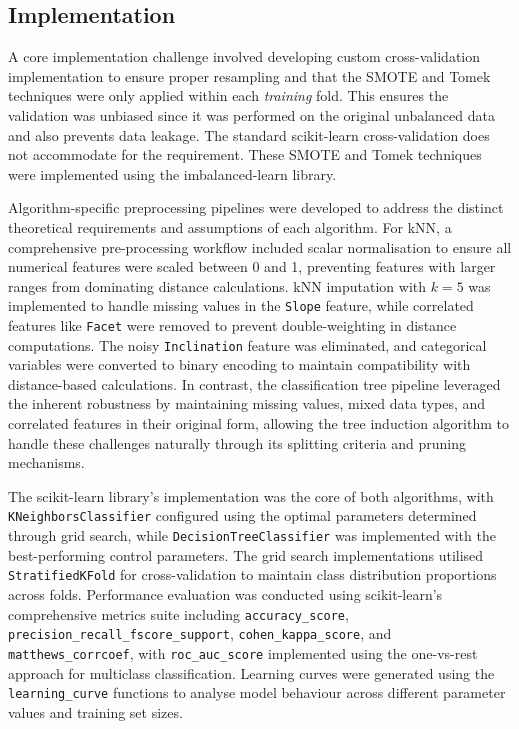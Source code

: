 \documentclass[10pt, conference]{IEEEtran}
\begin{document}
\subsection{Implementation}
A core implementation challenge involved developing custom cross-validation implementation to ensure proper resampling and that the SMOTE and Tomek techniques were only applied within each \textit{training} fold. This ensures the validation was unbiased since it was performed on the original unbalanced data and also prevents data leakage. The standard scikit-learn cross-validation does not accommodate for the requirement. These SMOTE and Tomek techniques were implemented using the imbalanced-learn library.

Algorithm-specific preprocessing pipelines were developed to address the distinct theoretical requirements and assumptions of each algorithm. For kNN, a comprehensive pre-processing workflow included scalar normalisation to ensure all numerical features were scaled between 0 and 1, preventing features with larger ranges from dominating distance calculations. kNN imputation with $k=5$ was implemented to handle missing values in the \texttt{Slope} feature, while correlated features like \texttt{Facet} were removed to prevent double-weighting in distance computations. The noisy \texttt{Inclination} feature was eliminated, and categorical variables were converted to binary encoding to maintain compatibility with distance-based calculations. In contrast, the classification tree pipeline leveraged the inherent robustness by maintaining missing values, mixed data types, and correlated features in their original form, allowing the tree induction algorithm to handle these challenges naturally through its splitting criteria and pruning mechanisms.

The scikit-learn library's implementation was the core of both algorithms, with \texttt{KNeighborsClassifier} configured using the optimal parameters determined through grid search, while \texttt{DecisionTreeClassifier} was implemented with the best-performing control parameters. The grid search implementations utilised \texttt{StratifiedKFold} for cross-validation to maintain class distribution proportions across folds. Performance evaluation was conducted using scikit-learn's comprehensive metrics suite including \texttt{accuracy\_score}, \texttt{precision\_recall\_fscore\_support}, \texttt{cohen\_kappa\_score}, and \texttt{matthews\_corrcoef}, with \texttt{roc\_auc\_score} implemented using the one-vs-rest approach for multiclass classification. Learning curves were generated using the \texttt{learning\_curve} functions to analyse model behaviour across different parameter values and training set sizes. \\
\end{document}
